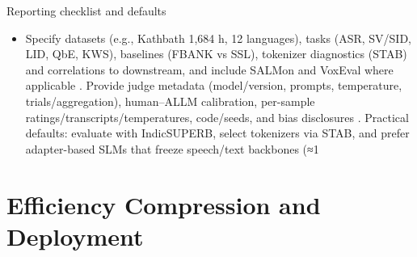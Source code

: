 Reporting checklist and defaults
\begin{itemize}
  \item Specify datasets (e.g., Kathbath 1,684 h, 12 languages), tasks (ASR, SV/SID, LID, QbE, KWS), baselines (FBANK vs SSL), tokenizer diagnostics (STAB) and correlations to downstream, and include SALMon and VoxEval where applicable \cite{entry2025indicsuperbspeechprocessinguniversalperf,vashishth2024stabspeechtokenizerassessmentbenchmark,maimon2025salmonsuiteacousticlanguagemodelevaluati,cui2025voxevalbenchmarkingknowledgeunderstandin}. Provide judge metadata (model/version, prompts, temperature, trials/aggregation), human–ALLM calibration, per-sample ratings/transcripts/temperatures, code/seeds, and bias disclosures \cite{wang2025bossbeyondsemanticspeech}. Practical defaults: evaluate with IndicSUPERB, select tokenizers via STAB, and prefer adapter-based SLMs that freeze speech/text backbones (≈1%
\end{itemize}

















\section{Efficiency Compression and Deployment} \label{sec:Efficiency Compression and Deployment}

